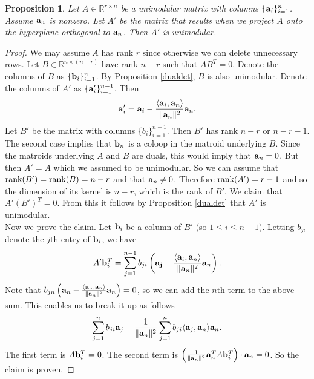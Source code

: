 \documentclass[letterpaper,12pt]{amsart}
\theoremstyle{plain}
\newtheorem{prop}[thm]{Proposition}
\theoremstyle{definition}
\theoremstyle{remark}
\newcommand{\rr}{\mathbb{R}}
\newcommand{\rank}{\textnormal{rank}}
\begin{document}
\begin{prop}\label{projection}
	Let $A \in \rr^{r\times n}$ be a unimodular matrix with columns $\{{\bf a}_i\}_{i=1}^n$.
	Assume ${\bf a}_n$ is nonzero.
	Let $A'$ be the matrix that results when we project $A$ onto the hyperplane orthogonal to ${\bf a}_n$.
	Then $A'$ is unimodular.
\end{prop}
\begin{proof}
	We may assume $A$ has rank $r$ since otherwise we can delete unnecessary rows.
	Let $B \in \rr^{n\times (n-r)}$ have rank $n-r$ such that $AB^T = 0$.
	Denote the columns of $B$ as $\{{\bf b}_i\}_{i=1}^n$.
	By Proposition \ref{dualdet}, $B$ is also unimodular.
	Denote the columns of $A'$ as $\{{\bf a}_i'\}_{i=1}^{n-1}$.
	Then
	\[
		{\bf a}_i' = {\bf a}_i - \frac{\langle {\bf a}_i, {\bf a}_n \rangle}{\|{\bf a}_n\|^2} {\bf a}_n.
	\]
	Let $B'$ be the matrix with columns $\{b_i\}_{i=1}^{n-1}$.
	Then $B'$ has rank $n-r$ or $n-r-1$.
	The second case implies that ${\bf b}_n$ is a coloop in the matroid underlying $B$.
	Since the matroids underlying $A$ and $B$ are duals, this would imply that ${\bf a}_n = 0$.
	But then $A' = A$ which we assumed to be unimodular.
	So we can assume that $\rank(B') = \rank(B) = n-r$ and that ${\bf a}_n \neq 0$.
	Therefore $\rank(A') = r-1$ and so the dimension of its kernel is $n-r$, which is the rank of $B'$.
	We claim that $A'(B')^T = 0$.
	From this it follows by Proposition \ref{dualdet} that $A'$ is unimodular.
	\\
	\indent
	Now we prove the claim.
	Let ${\bf b}_i$ be a column of $B'$ (so $1 \le i \le n-1$).
	Letting $b_{ji}$ denote the $j$th entry of ${\bf b}_i$, we have
	\[
		A'{\bf b}_i^T = \sum_{j=1}^{n-1} b_{ji} \left({\bf a_j} - \frac{\langle {\bf a}_i, {\bf a}_n \rangle}{\|{\bf a}_n\|^2} {\bf a}_n\right).
	\]
	Note that $b_{jn}\left({\bf a}_n - \frac{\langle {\bf a}_n, {\bf a}_n \rangle}{\|{\bf a}_n\|^2} {\bf a}_n\right) = 0$,
	so we can add the $n$th term to the above sum.
	This enables us to break it up as follows
	\[
		\sum_{j=1}^n b_{ji}{\bf a}_j - \frac{1}{\|{\bf a}_n\|^2}\sum_{j=1}^n b_{ji} \langle {\bf a}_j, {\bf a}_n\rangle {\bf a}_n.
	\]
	The first term is $A{\bf b}_i^T = 0$.
	The second term is $\left(\frac{1}{\|{\bf a}_n\|^2} {\bf a}_n^TA{\bf b}_i^T\right)\cdot{\bf a}_n = 0$.
	So the claim is proven.
\end{proof}
\end{document}
